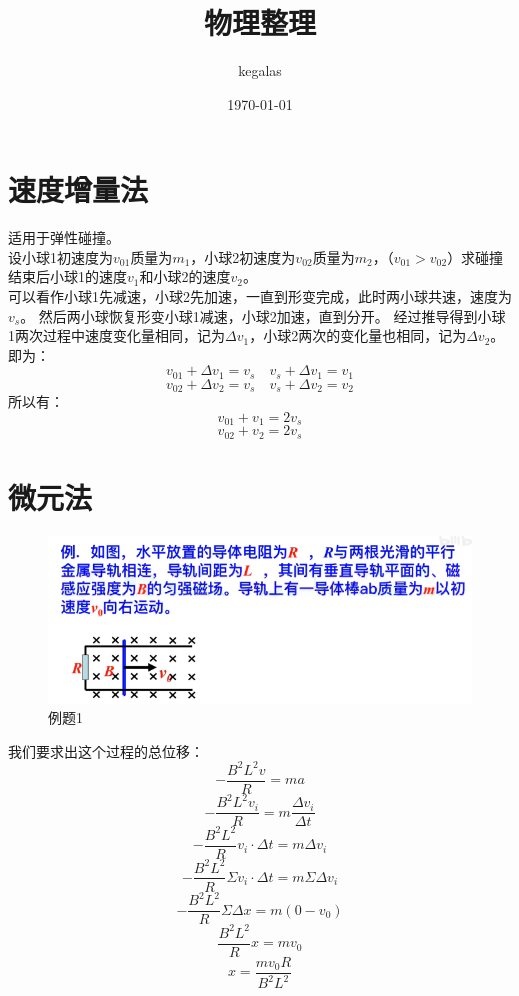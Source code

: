 \documentclass[UTF8]{ctexart}
\title{物理整理}
\author{kegalas}
\date{\today}
\begin{document}
    \maketitle
    \tableofcontents
    \newpage
    \section{速度增量法}
        适用于弹性碰撞。\\
        \indent 设小球1初速度为$v_{01}$质量为$m_1$，小球2初速度为$v_{02}$质量为$m_2$，（$v_{01}>v_{02}$）求碰撞结束后小球1的速度$v_1$和小球2的速度$v_2$。
        \\
        \indent 可以看作小球1先减速，小球2先加速，一直到形变完成，此时两小球共速，速度为$v_{s}$。
        然后两小球恢复形变小球1减速，小球2加速，直到分开。
        经过推导得到小球1两次过程中速度变化量相同，记为$\Delta v_1$，小球2两次的变化量也相同，记为$\Delta v_2$。\\
        即为：
        \[v_{01}+\Delta v_1=v_s \quad v_s+\Delta v_1=v_1\]
        \[v_{02}+\Delta v_2=v_s \quad v_s+\Delta v_2=v_2\]
        所以有：
        \[v_{01}+v_1=2v_s\]
        \[v_{02}+v_2=2v_s\]
    \section{微元法}
        \begin{figure}[H]
            \includegraphics{2-1.png}
            \caption{例题1}
        \end{figure}
        我们要求出这个过程的总位移：
        \[-\frac{B^2 L^2 v}{R}=ma\]
        \[-\frac{B^2 L^2 v_i}{R}=m\frac{\Delta v_i}{\Delta t}\]
        \[-\frac{B^2 L^2 }{R}v_i\cdot \Delta t=m\Delta v_i\]
        \[-\frac{B^2 L^2 }{R}\Sigma v_i\cdot \Delta t=m\Sigma \Delta v_i\]
        \[-\frac{B^2 L^2 }{R}\Sigma \Delta x=m(0-v_0)\]
        \[\frac{B^2 L^2 }{R}x=m v_0\]
        \[x=\frac{m v_0 R}{B^2 L^2}\]
\end{document}
